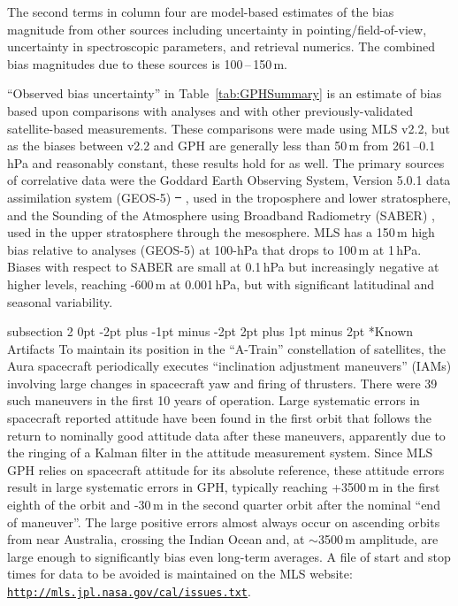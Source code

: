 \documentclass[11pt,draft]{report}
\makeatletter
\renewcommand{\subsection}{\@startsection%
  {subsection}%
  {2}%
  {0pt}%
  {-2pt plus -1pt minus -2pt}%
  {2pt plus 1pt minus 2pt}%
  {\large\sffamily\fontseries{sb}\selectfont\flushleft\color{SectionColor}\figureversion{tabular}}}%
\providecommand{\DIFaddtex}[1]{{\protect\color{blue}\uwave{#1}}} %
\providecommand{\DIFdeltex}[1]{{\protect\color{red}\sout{#1}}}                      %
\providecommand{\DIFaddbegin}{} %
\providecommand{\DIFaddend}{} %
\providecommand{\DIFdelbegin}{} %
\providecommand{\DIFdelend}{} %
\providecommand{\DIFadd}[1]{\texorpdfstring{\DIFaddtex{#1}}{#1}} %
\providecommand{\DIFdel}[1]{\texorpdfstring{\DIFdeltex{#1}}{}} %
\makeatother
\begin{document}
The second terms in column four are model-based estimates of the bias
magnitude from other sources including uncertainty in
pointing/field-of-view, uncertainty in spectroscopic parameters, and
retrieval numerics.  The combined bias magnitudes due to these sources
is 100\,--\,150\,m.

``Observed bias uncertainty'' in Table~\ref{tab:GPHSummary} is an
estimate of bias based upon comparisons with analyses and with other
previously-validated satellite-based measurements.  These comparisons
were made using MLS v2.2, but as the biases between v2.2 and \thisv GPH
are generally less than 50\,m from 261\,--0.1\,hPa and reasonably
constant, these results hold for \thisv as well.  The primary sources of
correlative data were the Goddard Earth Observing System, Version 5.0.1
data assimilation system (GEOS-5) \DIFdelbegin \DIFdel{\mbox{%
\citep{ReineckerEtal07}}%
}\DIFdelend \DIFaddbegin \DIFadd{\mbox{%
\citep{RieneckerEtal07}}%
}\DIFaddend , used in the
troposphere and lower stratosphere, and the Sounding of the Atmosphere
using Broadband Radiometry (SABER) \citep{MlynczakAndRussell95}, used in
the upper stratosphere through the mesosphere.  MLS has a 150\,m high
bias relative to analyses (GEOS-5) at 100-hPa that drops to 100\,m at
1\,hPa.  Biases with respect to SABER are small at 0.1\,hPa but
increasingly negative at higher levels, reaching -600\,m at 0.001\,hPa,
but with significant latitudinal and seasonal variability.

\subsection*{Known Artifacts}
To maintain its position in the ``A-Train'' constellation of satellites,
the Aura spacecraft periodically executes ``inclination adjustment
maneuvers'' (IAMs) involving large changes in spacecraft yaw and firing
of thrusters.  There were 39 such maneuvers in the first 10 years of
operation.  Large systematic errors in spacecraft reported attitude have
been found in the first orbit that follows the return to nominally good
attitude data after these maneuvers, apparently due to the ringing of a
Kalman filter in the attitude measurement system. Since MLS GPH relies
on spacecraft attitude for its absolute reference, these attitude errors
result in large systematic errors in GPH, typically reaching +3500\,m in
the first eighth of the orbit and -30\,m in the second quarter orbit
after the nominal ``end of maneuver''.  The large positive errors almost
always occur on ascending orbits from near Australia, crossing the
Indian Ocean and, at $\sim$3500\,m amplitude, are large enough to
significantly bias even long-term averages.  A file of start and stop
times for data to be avoided is maintained on the MLS website:
\href{http://mls.jpl.nasa.gov/cal/issues.txt}{\texttt{http://mls.jpl.nasa.gov/cal/issues.txt}}.
\end{document}
